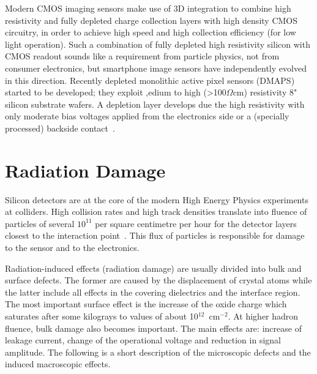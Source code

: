 
Modern CMOS imaging sensors make use of 3D integration to combine high resistivity and 
fully depleted charge collection layers with high density CMOS circuitry, in order to achieve high speed 
and high collection efficiency (for low light operation). Such a combination of fully depleted high 
resistivity silicon with CMOS readout sounds like a requirement from particle physics, not from 
consumer electronics, but smartphone image sensors have independently evolved in this 
direction. Recently depleted monolithic active pixel sensors 
(DMAPS) started to be developed; they exploit ,edium to high (>100$\Omega$cm) resistivity 8" silicon substrate wafers. A depletion layer develops due the high resistivity with only moderate bias voltages applied from the electronics side or a (specially processed) backside 
contact~\cite{Garcia-Sciveres:2017ymt}.

\section{Radiation Damage}
\label{sec:RadDam}

Silicon detectors are at the core of the modern High Energy Physics experiments at colliders. 
High collision rates 
and high track densities translate into fluence of particles of several $10^{11}$ per square centimetre 
per hour for the detector layers closest to the interaction point~\cite{rossi2006pixel}. This flux of 
particles is responsible for damage to the sensor and to the electronics. 

Radiation-induced effects (radiation damage) are usually divided into bulk and surface defects. The 
former are caused by the displacement of crystal atoms while the latter include all effects in the 
covering dielectrics and the interface region. The most important surface effect is the increase of the 
oxide charge which saturates after some kilograys to values of about 10$^{12}$~cm$^{-2}$. 
At higher hadron fluence, bulk damage also becomes important. The main effects are: increase of 
leakage current, change of the operational voltage and reduction in signal amplitude. 
The following is a short description of the microscopic defects and the induced macroscopic effects.

